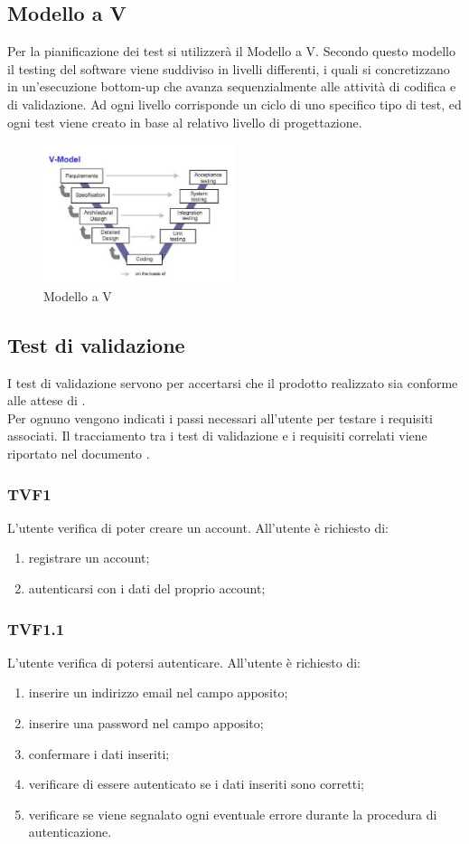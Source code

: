 	\subsection{Modello a V}
	\label{sec:5.2}
			Per la pianificazione dei test si utilizzerà il Modello a V. Secondo questo modello il testing del software viene suddiviso in livelli differenti, i quali si concretizzano in un'esecuzione bottom-up che avanza sequenzialmente alle attività di codifica e di validazione. Ad ogni livello corrisponde un ciclo di uno specifico tipo di test, ed ogni test viene creato in base al relativo livello di progettazione.
			\begin{figure}[htp]
				\centering
				\includegraphics[width=0.5\textwidth]{img/V-model.jpg}
				\caption{Modello a V}
			\end{figure}
	\subsection{Test di validazione}
	\label{sec:5.3}
	
		I test di validazione servono per accertarsi che il prodotto realizzato sia conforme alle attese di \PROPONENTE. \\
		Per ognuno vengono indicati i passi necessari all'utente per testare i requisiti associati. Il tracciamento tra i test di validazione e i requisiti correlati viene riportato nel documento \ARdoc.
		\subsubsection{TVF1}
			L'utente verifica di poter creare un account. All'utente è richiesto di:
			\begin{enumerate}
				\item registrare un account;
				\item autenticarsi con i dati del proprio account;
			\end{enumerate}
		\subsubsection{TVF1.1}
			L'utente verifica di potersi autenticare. All'utente è richiesto di:
			\begin{enumerate}
				\item inserire un indirizzo email nel campo apposito;
				\item inserire una password nel campo apposito;
				\item confermare i dati inseriti;
				\item verificare di essere autenticato se i dati inseriti sono corretti;
				\item verificare se viene segnalato ogni eventuale errore durante la procedura di autenticazione. 
			\end{enumerate}
